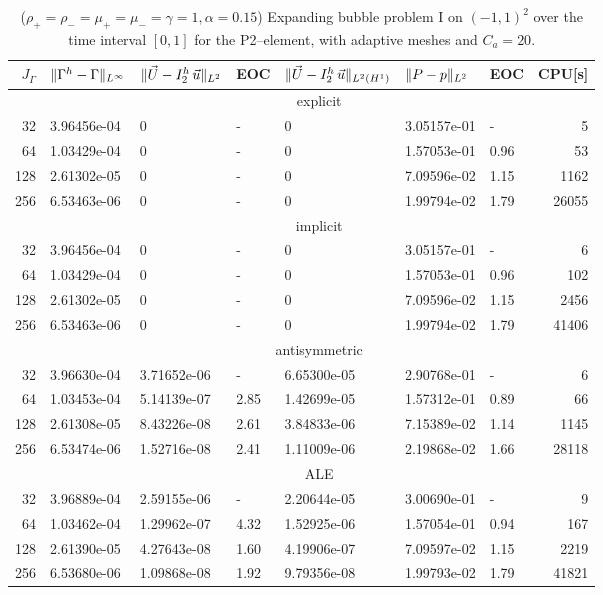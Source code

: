 \begin{table}
\center
\hspace*{-3.25cm}
\begin{tabular}{rllllllr}
\hline
$J_\Gamma$ & $\|\Gamma^h - \Gamma\|_{L^\infty}$ & $\|\vec U - I^h_{2}\,\vec u\|_{L^2}$ & EOC & $\|\vec U - I^h_{2}\,\vec u\|_{L^2(H^1)}$ & $\|P - p\|_{L^2}$ & EOC
& CPU[s] \\
\hline
& \multicolumn{7}{c}{explicit} \\
\hline
 32 & 3.96456e-04 & 0 & - & 0 & 3.05157e-01 &    - &     5 \\
 64 & 1.03429e-04 & 0 & - & 0 & 1.57053e-01 & 0.96 &    53 \\
128 & 2.61302e-05 & 0 & - & 0 & 7.09596e-02 & 1.15 &  1162 \\
256 & 6.53463e-06 & 0 & - & 0 & 1.99794e-02 & 1.79 & 26055 \\
\hline
& \multicolumn{7}{c}{implicit} \\
\hline
 32 & 3.96456e-04 & 0 & - & 0 & 3.05157e-01 &    - &     6 \\
 64 & 1.03429e-04 & 0 & - & 0 & 1.57053e-01 & 0.96 &   102 \\
128 & 2.61302e-05 & 0 & - & 0 & 7.09596e-02 & 1.15 &  2456 \\
256 & 6.53463e-06 & 0 & - & 0 & 1.99794e-02 & 1.79 & 41406 \\
\hline
& \multicolumn{7}{c}{antisymmetric} \\
\hline
 32 & 3.96630e-04 & 3.71652e-06 &    - & 6.65300e-05 & 2.90768e-01 &    - &
6 \\
 64 & 1.03453e-04 & 5.14139e-07 & 2.85 & 1.42699e-05 & 1.57312e-01 & 0.89 &
66 \\
128 & 2.61308e-05 & 8.43226e-08 & 2.61 & 3.84833e-06 & 7.15389e-02 & 1.14 &
1145 \\
256 & 6.53474e-06 & 1.52716e-08 & 2.41 & 1.11009e-06 & 2.19868e-02 & 1.66 &
28118 \\
\hline
& \multicolumn{7}{c}{ALE} \\
\hline
 32 & 3.96889e-04 & 2.59155e-06 &    - & 2.20644e-05 & 3.00690e-01 &    - &
9 \\
 64 & 1.03462e-04 & 1.29962e-07 & 4.32 & 1.52925e-06 & 1.57054e-01 & 0.94 &
167 \\
128 & 2.61390e-05 & 4.27643e-08 & 1.60 & 4.19906e-07 & 7.09597e-02 & 1.15 &
2219 \\
256 & 6.53680e-06 & 1.09868e-08 & 1.92 & 9.79356e-08 & 1.99793e-02 & 1.79 &
41821 \\
\hline
\end{tabular}
\hspace*{-3.25cm}
\caption[Navier--Stokes expanding bubble I errors P2--\pdg]
{($\rho_+ = \rho_- = \mu_+ = \mu_- = \gamma = 1,\alpha=0.15$)
Expanding bubble problem I on $(-1,1)^2$ over the time interval $[0,1]$ for the
P2--\pdg element, with adaptive meshes and $C_a=20$\textdegree.}
\label{tab:nsexpandingbubbleIp2p1dg}
\end{table}

